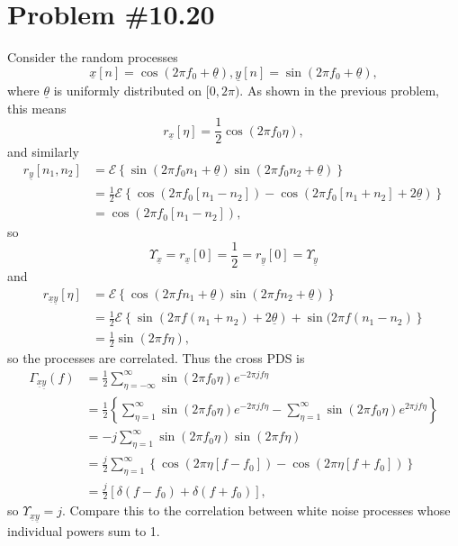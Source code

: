 \documentclass{article}
\begin{document}
\section*{Problem \#10.20}
Consider the random processes
$$
\underline{x}[n] = \cos (2 \pi f_0 + \underline{\theta}), 
\underline{y}[n] = \sin (2 \pi f_0 + \underline{\theta}),
$$
where $\underline{\theta}$ is uniformly distributed on $[0, 2\pi)$. 
As shown in the previous problem, this means
$$
r_{\underline{x}}[\eta] = \frac{1}{2} \cos (2 \pi f_0 \eta),
$$
and similarly
\begin{align*}
r_{\underline{y}}[n_1, n_2] &= \mathcal{E}\left\{
  \sin(2 \pi f_0 n_1 + \underline{\theta})\sin(2 \pi f_0 n_2 + \underline{\theta})\right\} \\
  &= \frac{1}{2} \mathcal{E}\left\{
    \cos (2 \pi f_0 [n_1 - n_2]) - \cos (2 \pi f_0 [n_1 + n_2] + 2\underline{\theta})\right\} \\
  &= \cos (2 \pi f_0 [n_1 - n_2]),
\end{align*}
so 
$$
\Upsilon_{\underline{x}} = r_{\underline{x}}[0] = \frac{1}{2}
 = r_{\underline{y}}[0] = \Upsilon_{\underline{y}}
$$
and
\begin{align*}
  r_{\underline{x}\underline{y}}[\eta] &= \mathcal{E}\left\{
    \cos (2 \pi f n_1 + \underline{\theta})
    \sin (2 \pi f n_2 + \underline{\theta})\right\} \\
  &= \frac{1}{2} \mathcal{E} \left\{
       \sin (2 \pi f (n_1 + n_2) + 2 \underline{\theta}) +
       \sin (2 \pi f (n_1 - n_2)\right\} \\
  &= \frac{1}{2} \sin (2 \pi f \eta),
\end{align*}
so the processes are correlated.
Thus the cross PDS is
\begin{align*}
  \Gamma_{\underline{x} \underline{y}} (f) &=
    \frac{1}{2} \sum_{\eta = -\infty}^{\infty}
      \sin (2 \pi f_0 \eta) e^{- 2 \pi j f \eta} \\
  &= \frac{1}{2} \left\{
       \sum_{\eta = 1}^{\infty} \sin (2 \pi f_0 \eta)
                                e^{-2 \pi j f \eta} 
     - \sum_{\eta = 1}^{\infty} \sin (2 \pi f_0 \eta)
                                e^{2 \pi j f \eta} \right\}\\
  &= -j \sum_{\eta = 1}^{\infty} \sin (2 \pi f_0 \eta)
                                 \sin (2 \pi f \eta) \\
  &= \frac{j}{2} \sum_{\eta = 1}^{\infty}\left\{
       \cos (2 \pi \eta [f - f_0]) 
     - \cos (2 \pi \eta [f + f_0]) \right\}\\
  &= \frac{j}{2} [ \delta(f - f_0) + \delta (f + f_0) ],
\end{align*}
so $\Upsilon_{\underline{x} \underline{y}} = j$.
Compare this to the correlation between white noise
processes whose individual powers sum to 1.
\end{document}
